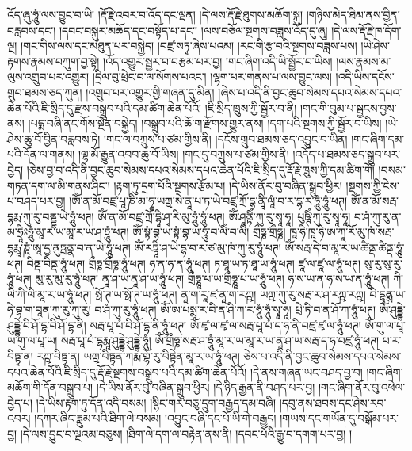 འོད་ཞུ་ཧཱུཾ་ལས་བྱུང་བ་ཡི། །རྡོ་རྗེ་འབར་བ་འོད་དང་ལྡན། །དེ་ལས་རྡོ་རྗེ་ཐུགས་མཆོག་སྐུ། །གཉིས་མེད་ཐིམ་ནས་བྱིན་བརླབས་དང་། །དབང་བསྐུར་མཆོད་དང་བསྟོད་པ་དང་། །ལས་བཅོལ་སྔགས་བཟླས་འོད་དུ་ཞུ། །དེ་ལས་རྡོ་རྗེ་ཁ་དོག་ལྔ། །གང་གིས་ལས་དང་མཐུན་པར་བསྐྱེད། །བཛྲ་སཏྭ་ཞེས་པའམ། །རང་གི་རྩ་བའི་སྔགས་བཟླས་པས། །ཡེ་ཤེས་རྟགས་རྣམས་བཀུག་བྱ་སྟེ། །འོད་འགྱུར་སྦྱར་བ་བརྩམ་པར་བྱ། །གང་ཞིག་འདི་ཡི་སྦྱོར་བ་ཡིས། །ལས་རྣམས་མ་ལུས་འགྲུབ་པར་འགྱུར། །དྲིལ་བུ་ཕྲེང་བ་ལ་སོགས་པའང་། །ལྷག་པར་གནས་པ་ལས་བྱུང་ལས། །འདི་ཡིས་དངོས་གྲུབ་ཐམས་ཅད་ཀུན། །འགྲུབ་པར་འགྱུར་གྱི་གཞན་དུ་མིན། །ཞེས་པ་འདི་ནི་བྱང་ཆུབ་སེམས་དཔའ་སེམས་དཔའ་ཆེན་པོའི་ཇི་སྲིད་དུ་རྫས་བསྒྲུབ་པའི་དམ་ཚིག་ཆེན་པོའོ། །ཇི་སྲིད་ཁྲུས་ཀྱི་སྦྱོར་བ་ནི། །གང་གི་བུམ་པ་སྦྱངས་བྱས་ནས། །པདྨ་བཞི་ནང་གོས་སྔོན་བསྐྱེད། །བསྒྲུབ་པའི་ཆོ་ག་རྫོགས་གྱུར་ནས། །དག་པའི་སྔགས་ཀྱི་སྦྱོར་བ་ཡིས། །ཡེ་ཤེས་ཆུ་བོ་བྱིན་བརླབས་ཏེ། །གང་ལ་བཀྲུས་པ་ཙམ་གྱིས་ནི། །དངོས་གྲུབ་ཐམས་ཅད་འབྱུང་བ་ཡིན། །གང་ཞིག་དམ་པའི་དོན་ལ་གནས། །ལྷ་མོ་རྒྱུན་འབབ་ཆུ་བོ་ཡིས། །གང་དུ་བཀྲུས་པ་ཙམ་གྱིས་ནི། །འདོད་པ་ཐམས་ཅད་སྒྲུབ་པར་བྱེད། །ཅེས་བྱ་བ་འདི་ནི་བྱང་ཆུབ་སེམས་དཔའ་སེམས་དཔའ་ཆེན་པོའི་ཇི་སྲིད་དུ་རྡོ་རྗེ་ཁྲུས་ཀྱི་དམ་ཚིག་གོ། །བསམ་གཏན་དག་ལ་མི་གནས་ཤིང་། །རྟག་ཏུ་དྲག་པོའི་སྔགས་རྩོམ་པ། །དེ་ཡིས་ནོར་བུ་བཞིན་སྒྲུབ་ཕྱིར། །སྔགས་ཀྱི་ངེས་པ་བཤད་པར་བྱ། །ཨོཾ་ན་མོ་བཛྲ་པཱ་ཎི་མ་ཧཱ་ཡཀྵ་སེ་ནཱ་པ་ཏ་ཡེ་བཛྲ་ཀྲོ་དྷ་ནཱི་ལཱཾ་བ་ར་​ དྷ་ར་ཧཱུཾ་ཧཱུཾ་ཕཊ། ཨོཾ་ན་མོ་སརྦ་དྷརྨ་ཀུ་རུ་བནྡྷ་ཡེ་ཧཱུཾ་ཕཊ། ཨོཾ་ན་མོ་བཛྲ་ཀྲོ་དྷཱི་ཤྭ་རི་མུ་ཧཱུཾ་ཧཱུཾ་ཕཊ། ཨོཾ་ཤཱནྟིཾ་ཀུ་རུ་སྭཱ་ཧཱ། པུཥྚིཾ་ཀུ་རུ་སྭཱ་ཧཱ། བ་ཤཾ་ཀུ་རུ་ན་མ་ཧྲཱིཿཧཱུཾ་མཱ་ར་ཡ་མཱ་ར་ཡ་ཤ་ཏྲཱུཾ་ཕཊ། ཨོཾ་སྟཾ་བྷ་ཡ་སྟཾ་བྷ་ཡ་ཧཱུཾ་བ་ལིཾ་བ་ལིཾ། གྲྀཧྞ་གྲྀཧྞ། ཁཱ་ཧི་ཁཱ་ཧི་ཨ་ཀཱ་རོ་མུ་ཁཾ་སརྦ་དྷརྨཱ་ཎཱཾ་ཨཱ་དྱ་ནུཏྤནྣ་བ་ན་ཡེ་ཧཱུཾ་ཕཊ། ཨོཾ་རཏྟཱི་ཤ་ཡེ་དྷ་བ་ར་ཙ་མུ་ཁཾ་ཀུ་རུ་ཧཱུཾ་ཕཊ། ཨོཾ་སརྦ་དེ་བ་མཱ་ར་ཡ་ཚིནྡ་ཚིནྡ་ཧཱུཾ་ཕཊ། བིནྡ་བིནྡ་ཧཱུཾ་ཕཊ། གྲྀཧྞ་གྲྀཧྞ་ཧཱུཾ་ཕཊ། ཧ་ན་ཧ་ན་ཧཱུཾ་ཕཊ། ཏ་ཐཱ་ཡ་ཏ་ཐཱ་ཡ་ཧཱུཾ་ཕཊ། ཛཱ་ལ་ཛཱ་ལ་ཧཱུཾ་ཕཊ། སུ་རུ་སུ་རུ་ཧཱུཾ་ཕཊ། མུ་རུ་མུ་རུ་ཧཱུཾ་ཕཊ། ནཱ་ཤ་ཡ་ནཱ་ཤ་ཡ་ཧཱུཾ་ཕཊ། གྲྀཧྞཱ་པ་ཡ་གྲྀཧྞཱ་པ་ཡ་ཧཱུཾ་ཕཊ། ཧ་ས་ཡ་ན་ཧ་ས་ཡ་ན་ཧཱུཾ་ཕཊ། ཀི་ལི་ཀི་ལི་མཱ་ར་ཡ་ཧཱུཾ་ཕཊ། སྥོ་ཊ་ཡ་སྥོ་ཊ་ཡ་ཧཱུཾ་ཕཊ། ནཱ་ག་རཱ་ཛ་ནཱ་ག་རཀྵ། ཡཀྵ་ཀུ་རུ་སརྦ་ར་ཤ་རཀྵ་རཀྵ། བི་དྷྭནྶ་ཡ་ཧེ་བྷ་ག་བཱན་ཀུ་རུ་ཀུ་རུ། བ་ཤཾ་ཀུ་རུ་ཧཱུཾ་ཕཊ། ཨོཾ་ཨ་པསྨ་ར་བི་ན་ཤི་ཀ་ར་ཧཱུཾ་ཧཱུཾ་སྭཱ་ཧཱ། པྲེ་ཏི་བ་ན་ཤོ་ཀ་ཧཱུཾ་ཕཊ། ཨོཾ་ཤུདྡྷེ་ཤུདྡྷེ་བི་ཤོ་དྷ་བི་ཤོ་དྷ་ནི། སརྦ་པཱ་པཾ་བི་ཤོ་དྷ་ནི་ཧཱུཾ་ཕཊ། ཨོཾ་ཛྭ་ལ་ཛྭ་ལ་སརྦ་པཱ་པཾ་ད་ཧ་ནི་བཛྲ་ཛྭ་ལ་ཧཱུཾ་ཕཊ། ཨོཾ་གུ་ལ་པཱ་ཡ་གུ་ལ་པཱ་ཡ། སརྦ་པཱ་པཾ་དྷརྨཱ་ཤུདྡྷེ་ཤུདྡྷེ་ཧཱུཾ། ཨོཾ་གྲྀཧྞ་སརྦ་ཤ་ཏྲཱུཾ་མཱ་ར་ཡ་མཱ་ར་ཡ་ནཱ་ཤ་ཡ་སརྦ་ད་ཧ་བཛྲ་ཧཱུཾ་ཕཊ། པ་ར་བིཏྟྭ་ན། རཀྵ་བིཏྟྭ་ན། ཡཀྵ་བིཏྟྭན་ཀརྨ་གྷོ་རུ་བིཏྟྭེན་མཱ་ར་ཡ་ཧཱུཾ་ཕཊ། ཅེས་པ་འདི་ནི་བྱང་ཆུབ་སེམས་དཔའ་སེམས་དཔའ་ཆེན་པོའི་ཇི་སྲིད་དུ་རྡོ་རྗེ་སྔགས་བསྒྲུབ་པའི་དམ་ཚིག་ཆེན་པོའོ། །དེ་ནས་གཞན་ཡང་བཤད་བྱ་བ། །གང་ཞིག་མཆོག་གི་དོན་བསྒྲུབ་པ། །དེ་ཡིས་ནོར་བུ་བཞིན་སྒྲུབ་ཕྱིར། །དེ་ཉིད་རྒྱན་ནི་བཤད་པར་བྱ། །གང་ཞིག་ནོར་བུ་འཕེལ་བྱེད་པ། །དེ་ཡིས་རྟག་ཏུ་དོན་འདི་བསམ། །སྙིང་གར་བཅུ་དྲུག་བརྒྱད་དམ་བཞི། །དབུ་ནས་ཐབས་དང་ཤེས་རབ་འབར། །དཀར་ཞིང་ཟླུམ་པའི་ཐིག་ལེ་བསམ། །འབྱུང་བཞི་དང་པོ་ཡི་གེ་བརྒྱད། །གཡས་དང་གཡོན་དུ་བསྒོམ་པར་བྱ། །དེ་ལས་བྱུང་བ་ལྔའམ་བཅུས། །ཐིག་ལེ་དག་ལ་བརྟེན་ནས་ནི། །དབང་པོའི་རྒྱུ་བ་དགག་པར་བྱ། །
